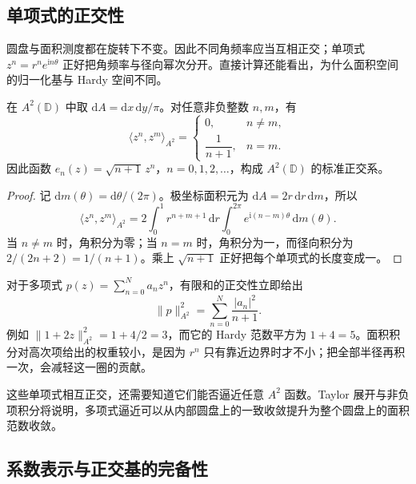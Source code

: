 \subsection{单项式的正交性}
\label{b3:subsec:280403}

圆盘与面积测度都在旋转下不变。因此不同角频率应当互相正交；单项式 \(z^n=r^ne^{\mathrm{i}n\theta}\) 正好把角频率与径向幂次分开。直接计算还能看出，为什么面积空间的归一化基与 Hardy 空间不同。

\begin{proposition}[单项式的面积内积]\label{b3:prop:28-monomial-inner-product}
在 \(A^2(\mathbb D)\) 中取 \(\mathrm{d}A=\mathrm{d}x\,\mathrm{d}y/\pi\)。对任意非负整数 \(n,m\)，有
\[
 \langle z^n,z^m\rangle_{A^2}
 =\begin{cases}
 0,&n\ne m,\\
 \dfrac1{n+1},&n=m.
 \end{cases}
\]
因此函数 \(e_n(z)=\sqrt{n+1}\,z^n\)，\(n=0,1,2,\ldots\)，构成 \(A^2(\mathbb D)\) 的标准正交系。
\end{proposition}
\begin{proof}
记 \(\mathrm{d}m(\theta)=\mathrm{d}\theta/(2\pi)\)。极坐标面积元为 \(\mathrm{d}A=2r\,\mathrm{d}r\,\mathrm{d}m\)，所以
\[
 \langle z^n,z^m\rangle_{A^2}
 =2\int_0^1r^{n+m+1}\,\mathrm{d}r
 \int_0^{2\pi}e^{\mathrm{i}(n-m)\theta}\,\mathrm{d}m(\theta).
\]
当 \(n\ne m\) 时，角积分为零；当 \(n=m\) 时，角积分为一，而径向积分为 \(2/(2n+2)=1/(n+1)\)。乘上 \(\sqrt{n+1}\) 正好把每个单项式的长度变成一。
\end{proof}

对于多项式 \(p(z)=\sum_{n=0}^Na_nz^n\)，有限和的正交性立即给出
\[
 \|p\|_{A^2}^2=\sum_{n=0}^N\frac{|a_n|^2}{n+1}.
\]
例如 \(\|1+2z\|_{A^2}^2=1+4/2=3\)，而它的 Hardy 范数平方为 \(1+4=5\)。面积积分对高次项给出的权重较小，是因为 \(r^n\) 只有靠近边界时才不小；把全部半径再积一次，会减轻这一圈的贡献。

\ProseParagraphBreak

这些单项式相互正交，还需要知道它们能否逼近任意 \(A^2\) 函数。Taylor 展开与非负项积分将说明，多项式逼近可以从内部圆盘上的一致收敛提升为整个圆盘上的面积范数收敛。

\subsection{系数表示与正交基的完备性}
\label{b3:subsec:280404}


